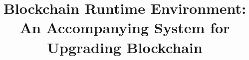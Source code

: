 \documentclass[sigplan,screen]{acmart}
\begin{document}
\title{Blockchain Runtime Environment: An Accompanying System for Upgrading Blockchain}









\renewcommand{\shortauthors}{}
\end{document}
